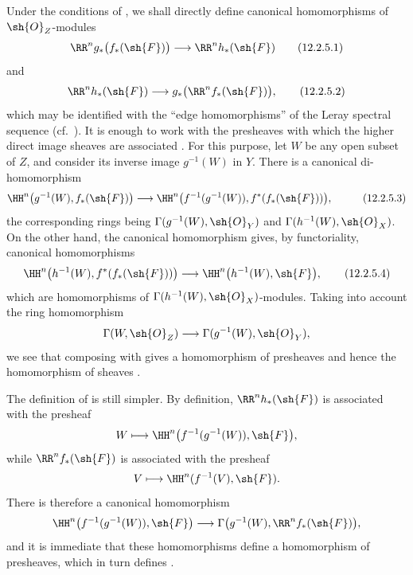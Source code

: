 \begin{env}[12.2.5]
\label{0.12.2.5}
Under the conditions of , we shall directly define
canonical homomorphisms of $\sh{O}_Z$-modules
\[
  \RR^n g_*\bigl(f_*(\sh{F})\bigr)
  \longrightarrow\RR^n h_*(\sh{F})
  \tag{12.2.5.1}
  \label{0.12.2.5.1}
\]
and
\[
  \RR^n h_*(\sh{F})
  \longrightarrow g_*\bigl(\RR^n f_*(\sh{F})\bigr),
  \tag{12.2.5.2}
  \label{0.12.2.5.2}
\]
which may be identified with the ``edge homomorphisms'' of the Leray
spectral sequence (cf.\ ).
It is enough to work with the presheaves with which the higher direct
image sheaves are associated .
For this purpose, let $W$ be any open subset of $Z$, and consider its
inverse image $g^{-1}(W)$ in $Y$.  There is a canonical
di-homomorphism
\[
  \begin{aligned}
  \HH^n\bigl(g^{-1}(W),f_*(\sh{F})\bigr)
  &\longrightarrow
  \HH^n\bigl(f^{-1}(g^{-1}(W)),
    f^*(f_*(\sh{F}))\bigr),
  \end{aligned}
  \tag{12.2.5.3}
  \label{0.12.2.5.3}
\]
the corresponding rings being
$\Gamma(g^{-1}(W),\sh{O}_Y)$ and
$\Gamma(h^{-1}(W),\sh{O}_X)$.
On the other hand, the canonical homomorphism
 gives, by functoriality,
canonical homomorphisms
\[
  \HH^n\bigl(h^{-1}(W),f^*(f_*(\sh{F}))\bigr)
  \longrightarrow
  \HH^n\bigl(h^{-1}(W),\sh{F}\bigr),
  \tag{12.2.5.4}
  \label{0.12.2.5.4}
\]
which are homomorphisms of
$\Gamma(h^{-1}(W),\sh{O}_X)$-modules.
Taking into account the ring homomorphism
\[
  \Gamma(W,\sh{O}_Z)
  \longrightarrow\Gamma(g^{-1}(W),\sh{O}_Y),
\]
we see that composing  with
 gives a homomorphism of presheaves and hence the
homomorphism of sheaves .

The definition of  is still simpler.
By definition, $\RR^n h_*(\sh{F})$ is associated with the presheaf
\[
  W\longmapsto
  \HH^n\bigl(f^{-1}(g^{-1}(W)),\sh{F}\bigr),
\]
while $\RR^n f_*(\sh{F})$ is associated with the presheaf
\[
  V\longmapsto\HH^n(f^{-1}(V),\sh{F}).
\]
There is therefore a canonical homomorphism
\[
  \HH^n\bigl(f^{-1}(g^{-1}(W)),\sh{F}\bigr)
  \longrightarrow
  \Gamma\bigl(g^{-1}(W),\RR^n f_*(\sh{F})\bigr),
\]
and it is immediate that these homomorphisms define a homomorphism of
presheaves, which in turn defines .
\end{env}

